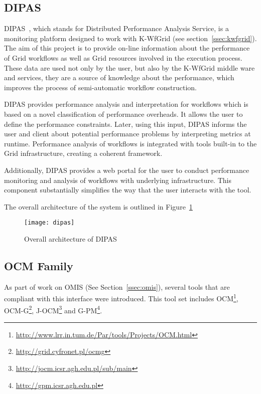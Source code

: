 
\subsection{DIPAS}

DIPAS~\cite{DIPAS}, which stands for Distributed Performance Analysis Service, is a monitoring platform designed to work with K-WfGrid (see section~\ref{ssec:kwfgrid}). The aim of this project is to provide on-line information about the performance of Grid workflows as well as Grid resources involved in the execution process. These data are used not only by the user, but also by the K-WfGrid middle ware and services, they are a source of knowledge about the performance, which improves the process of semi-automatic workflow construction.

DIPAS provides performance analysis and interpretation for workflows which is based on a novel classification of performance overheads. It allows the user to define the performance constraints. Later, using this input, DIPAS informs the user and client about potential performance problems by interpreting metrics at runtime. Performance analysis of workflows is integrated with tools built-in to the Grid infrastructure, creating a coherent framework.

Additionally, DIPAS provides a web portal for the user to conduct performance monitoring and analysis of workflows with underlying infrastructure. This component substantially simplifies the way that the user interacts with the tool.

The overall architecture of the system is outlined in Figure~\ref{fig:dipas}

\begin{figure}[ht]

\centering

\texttt{[image: dipas]} \caption{Overall architecture of DIPAS} \label{fig:dipas}

\end{figure}


\subsection{OCM Family}

As part of work on OMIS (See Section~\ref{ssec:omis}), several tools that are compliant with this interface were introduced. This tool set includes OCM\footnote{\url{http://www.lrr.in.tum.de/Par/tools/Projects/OCM.html}}, OCM-G\footnote{\url{http://grid.cyfronet.pl/ocmg}}, J-OCM\footnote{\url{http://jocm.icsr.agh.edu.pl/sub/main}} and G-PM\footnote{\url{http://gpm.icsr.agh.edu.pl}}.

